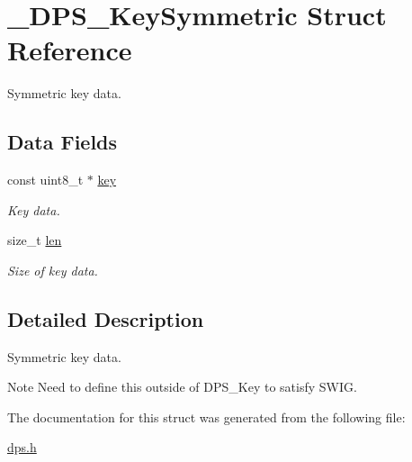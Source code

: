\hypertarget{struct___d_p_s___key_symmetric}{}\section{\+\_\+\+D\+P\+S\+\_\+\+Key\+Symmetric Struct Reference}
\label{struct___d_p_s___key_symmetric}


Symmetric key data.  


\subsection*{Data Fields}
\begin{DoxyCompactItemize}
\item 
\mbox{\label{struct___d_p_s___key_symmetric_affb7a3c0682b963d4011a1d7ecbbe76a}} 
const uint8\+\_\+t $\ast$ \hyperlink{struct___d_p_s___key_symmetric_affb7a3c0682b963d4011a1d7ecbbe76a}{key}
\begin{DoxyCompactList}\small\item\em Key data. \end{DoxyCompactList}\item 
\mbox{\label{struct___d_p_s___key_symmetric_ad12194a41f7828b7b7098608bf7d5fd0}} 
size\+\_\+t \hyperlink{struct___d_p_s___key_symmetric_ad12194a41f7828b7b7098608bf7d5fd0}{len}
\begin{DoxyCompactList}\small\item\em Size of key data. \end{DoxyCompactList}\end{DoxyCompactItemize}


\subsection{Detailed Description}
Symmetric key data. 

\begin{DoxyNote}{Note}
Need to define this outside of D\+P\+S\+\_\+\+Key to satisfy S\+W\+IG. 
\end{DoxyNote}


The documentation for this struct was generated from the following file\+:\begin{DoxyCompactItemize}
\item 
\hyperlink{dps_8h}{dps.\+h}\end{DoxyCompactItemize}
